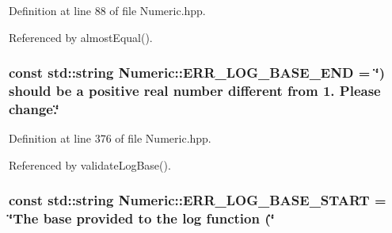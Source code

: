 \-Definition at line 88 of file \-Numeric.\-hpp.



\-Referenced by almost\-Equal().

\hypertarget{classmultiscale_1_1Numeric_a291c98ea0c6e6c4042fe9ecc4af0443a}{
\subsubsection[{\-E\-R\-R\-\_\-\-L\-O\-G\-\_\-\-B\-A\-S\-E\-\_\-\-E\-N\-D}]{\setlength{\rightskip}{0pt plus 5cm}const std\-::string {\bf \-Numeric\-::\-E\-R\-R\-\_\-\-L\-O\-G\-\_\-\-B\-A\-S\-E\-\_\-\-E\-N\-D} = \char`\"{}) should be a positive real number different from 1. \-Please change.\char`\"{}}}\label{classmultiscale_1_1Numeric_a291c98ea0c6e6c4042fe9ecc4af0443a}


\-Definition at line 376 of file \-Numeric.\-hpp.



\-Referenced by validate\-Log\-Base().

\hypertarget{classmultiscale_1_1Numeric_a551052e6be615efea82ea046ba178010}{
\subsubsection[{\-E\-R\-R\-\_\-\-L\-O\-G\-\_\-\-B\-A\-S\-E\-\_\-\-S\-T\-A\-R\-T}]{\setlength{\rightskip}{0pt plus 5cm}const std\-::string {\bf \-Numeric\-::\-E\-R\-R\-\_\-\-L\-O\-G\-\_\-\-B\-A\-S\-E\-\_\-\-S\-T\-A\-R\-T} = \char`\"{}\-The base provided to the {\bf log} function (\char`\"{}}}\label{classmultiscale_1_1Numeric_a551052e6be615efea82ea046ba178010}


